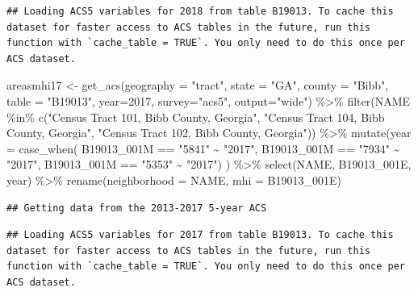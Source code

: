 \documentclass[
]{article}
\newenvironment{Shaded}{\begin{snugshade}}{\end{snugshade}}
\newcommand{\AttributeTok}[1]{\textcolor[rgb]{0.77,0.63,0.00}{#1}}
\newcommand{\DecValTok}[1]{\textcolor[rgb]{0.00,0.00,0.81}{#1}}
\newcommand{\FunctionTok}[1]{\textcolor[rgb]{0.00,0.00,0.00}{#1}}
\newcommand{\NormalTok}[1]{#1}
\newcommand{\OtherTok}[1]{\textcolor[rgb]{0.56,0.35,0.01}{#1}}
\newcommand{\SpecialCharTok}[1]{\textcolor[rgb]{0.00,0.00,0.00}{#1}}
\newcommand{\StringTok}[1]{\textcolor[rgb]{0.31,0.60,0.02}{#1}}
\begin{document}
\begin{verbatim}
## Loading ACS5 variables for 2018 from table B19013. To cache this dataset for faster access to ACS tables in the future, run this function with `cache_table = TRUE`. You only need to do this once per ACS dataset.
\end{verbatim}

\begin{Shaded}
\begin{Highlighting}[]
\NormalTok{areasmhi17 }\OtherTok{\textless{}{-}} \FunctionTok{get\_acs}\NormalTok{(}\AttributeTok{geography =} \StringTok{"tract"}\NormalTok{, }\AttributeTok{state =} \StringTok{"GA"}\NormalTok{, }\AttributeTok{county =} \StringTok{"Bibb"}\NormalTok{, }\AttributeTok{table =} \StringTok{"B19013"}\NormalTok{, }\AttributeTok{year=}\DecValTok{2017}\NormalTok{, }\AttributeTok{survey=}\StringTok{"acs5"}\NormalTok{, }\AttributeTok{output=}\StringTok{"wide"}\NormalTok{) }\SpecialCharTok{\%\textgreater{}\%}
\FunctionTok{filter}\NormalTok{(NAME }\SpecialCharTok{\%in\%} \FunctionTok{c}\NormalTok{(}\StringTok{"Census Tract 101, Bibb County, Georgia"}\NormalTok{, }\StringTok{"Census Tract 104, Bibb County, Georgia"}\NormalTok{, }\StringTok{"Census Tract 102, Bibb County, Georgia"}\NormalTok{)) }\SpecialCharTok{\%\textgreater{}\%}
\FunctionTok{mutate}\NormalTok{(}\AttributeTok{year =} \FunctionTok{case\_when}\NormalTok{(}
\NormalTok{  B19013\_001M }\SpecialCharTok{==} \StringTok{"5841"} \SpecialCharTok{\textasciitilde{}} \StringTok{"2017"}\NormalTok{,}
\NormalTok{  B19013\_001M }\SpecialCharTok{==} \StringTok{"7934"} \SpecialCharTok{\textasciitilde{}} \StringTok{"2017"}\NormalTok{,}
\NormalTok{  B19013\_001M }\SpecialCharTok{==} \StringTok{"5353"} \SpecialCharTok{\textasciitilde{}} \StringTok{"2017"}\NormalTok{) ) }\SpecialCharTok{\%\textgreater{}\%}
\FunctionTok{select}\NormalTok{(NAME, B19013\_001E, year) }\SpecialCharTok{\%\textgreater{}\%}
\FunctionTok{rename}\NormalTok{(}\AttributeTok{neighborhood =}\NormalTok{ NAME, }\AttributeTok{mhi =}\NormalTok{ B19013\_001E)}
\end{Highlighting}
\end{Shaded}

\begin{verbatim}
## Getting data from the 2013-2017 5-year ACS
\end{verbatim}

\begin{verbatim}
## Loading ACS5 variables for 2017 from table B19013. To cache this dataset for faster access to ACS tables in the future, run this function with `cache_table = TRUE`. You only need to do this once per ACS dataset.
\end{verbatim}
\end{document}
